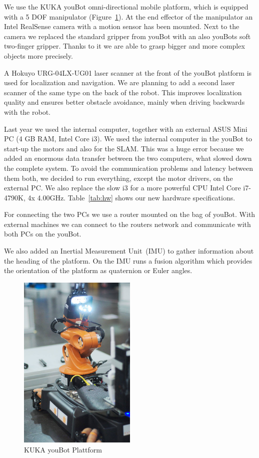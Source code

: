 We use the KUKA youBot omni-directional mobile platform, which is equipped with a 5 DOF manipulator (Figure~\ref{fig:youBot}). At the end effector of the manipulator an Intel RealSense camera with a motion sensor has been mounted. Next to the camera we replaced the standard gripper from youBot with an also youBots soft two-finger gripper. Thanks to it we are able to grasp bigger and more complex objects more precisely.

A Hokuyo URG-04LX-UG01 laser scanner at the front of the youBot platform is used for localization and navigation. We are planning to add a second laser scanner of the same type on the back of the robot. This improves localization quality and ensures better obstacle avoidance, mainly when driving backwards with the robot.

Last year we used the internal computer, together with an external ASUS Mini PC (4 GB RAM, Intel Core i3). We used the internal computer in the youBot to start-up the motors and also for the SLAM. This was a huge error because we added an enormous data transfer between the two computers, what slowed down the complete system. To avoid the communication problems and latency between them both, we decided to run everything, except the motor drivers, on the external PC. We also replace the slow i3 for a more powerful CPU Intel Core i7-4790K, 4x 4.00GHz. Table~\ref{tab:hw} shows our new hardware specifications. 

For connecting the two PCs we use a router mounted on the bag of youBot. With external machines we can connect to the routers network and communicate with both PCs on the youBot.

We also added an Inertial Measurement Unit~(IMU) to gather information about the heading of the platform. On the IMU runs a fusion algorithm which provides the orientation of the platform as quaternion or Euler angles.

\begin{figure}[htb]
	\centering
	\includegraphics[width=0.5\textwidth]{img/YoubotInAction.jpg}
	\caption{KUKA youBot Plattform}
	\label{fig:youBot}
\end{figure}

